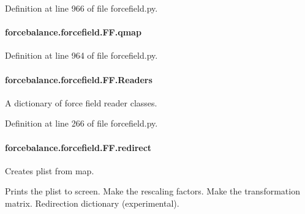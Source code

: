 Definition at line 966 of file forcefield.\-py.

\hypertarget{classforcebalance_1_1forcefield_1_1FF_a20352a24f2babfbf1ca4dd3d51f1483b}{
\paragraph[{qmap}]{\setlength{\rightskip}{0pt plus 5cm}forcebalance.\-forcefield.\-F\-F.\-qmap}}\label{classforcebalance_1_1forcefield_1_1FF_a20352a24f2babfbf1ca4dd3d51f1483b}


Definition at line 964 of file forcefield.\-py.

\hypertarget{classforcebalance_1_1forcefield_1_1FF_a9db381836dba8b531ff7d45dce877f4f}{
\paragraph[{Readers}]{\setlength{\rightskip}{0pt plus 5cm}forcebalance.\-forcefield.\-F\-F.\-Readers}}\label{classforcebalance_1_1forcefield_1_1FF_a9db381836dba8b531ff7d45dce877f4f}


A dictionary of force field reader classes. 



Definition at line 266 of file forcefield.\-py.

\hypertarget{classforcebalance_1_1forcefield_1_1FF_ada9b82220eb6e6335a36617dd5746695}{
\paragraph[{redirect}]{\setlength{\rightskip}{0pt plus 5cm}forcebalance.\-forcefield.\-F\-F.\-redirect}}\label{classforcebalance_1_1forcefield_1_1FF_ada9b82220eb6e6335a36617dd5746695}


Creates plist from map. 

Prints the plist to screen. Make the rescaling factors. Make the transformation matrix. Redirection dictionary (experimental). 

